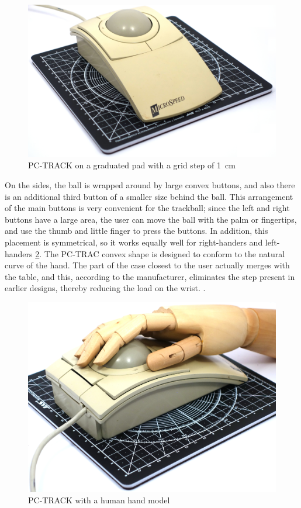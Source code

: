 \documentclass[11pt, a4paper]{article}
\begin{document}
\begin{figure}[h]
    \centering
    \includegraphics[scale=0.3]{1991_microspeed_pc-track/size_60.jpg}
    \caption{PC-TRACK on a graduated pad with a grid step of 1~cm}
    \label{fig:PCTRACKSize}
\end{figure}

On the sides, the ball is wrapped around by large convex buttons, and also there is an additional third button of a smaller size behind the ball. This arrangement of the main buttons is very convenient for the trackball; since the left and right buttons have a large area, the user can move the ball with the palm or fingertips, and use the thumb and little finger to press the buttons. In addition, this placement is symmetrical, so it works equally well for right-handers and left-handers \ref{fig:PCTRACKHand}. The PC-TRAC convex shape is designed to conform to the natural curve of the hand. The part of the case closest to the user actually merges with the table, and this, according to the manufacturer, eliminates the step present in earlier designs, thereby reducing the load on the wrist. \cite{PC}.

\begin{figure}[h]
    \centering
    \includegraphics[scale=0.3]{1991_microspeed_pc-track/hand_60.jpg}
    \caption{PC-TRACK with a human hand model}
    \label{fig:PCTRACKHand}
\end{figure}
\end{document}
